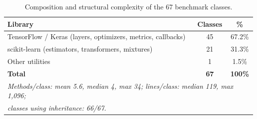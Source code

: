 \documentclass[pdflatex,sn-mathphys-ay]{sn-jnl}%
\theoremstyle{thmstyleone}%
\theoremstyle{thmstyletwo}%
\theoremstyle{thmstylethree}%
\begin{document}
{\color{blue}
\begin{table}[h]
\centering
\small
\caption{Composition and structural complexity of the 67 benchmark classes.}
\label{tab:dataset-stats}
\begin{tabular}{lcc}
\toprule
\textbf{Library} & \textbf{Classes} & \textbf{\%} \\
\midrule
TensorFlow / Keras (layers, optimizers, metrics, callbacks) & 45 & 67.2\% \\
scikit-learn (estimators, transformers, mixtures) & 21 & 31.3\% \\
Other utilities & 1 & 1.5\% \\
\midrule
\textbf{Total} & \textbf{67} & \textbf{100\%} \\
\midrule
\multicolumn{3}{l}{\textit{Methods/class: mean 5.6, median 4, max 34; lines/class: median 119, max 1,096;}} \\
\multicolumn{3}{l}{\textit{classes using inheritance: 66/67.}} \\
\bottomrule
\end{tabular}
\end{table}


}
\end{document}

